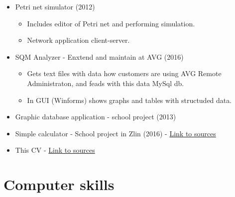 \documentclass[11pt,a4paper,sans]{moderncv}
\newcommand{\Csh}{C{\lserif{\#}}}
\begin{document}
{
\begin{itemize}
	\item Petri net simulator (2012)	
	\begin{itemize}
		\item Includes editor of Petri net and performing simulation.
		\item Network application client-server.
	\end{itemize}
\end{itemize}
}

\cvitemwithcomment{\Csh{}}{}
{
\begin{itemize}
	\item SQM Analyzer - Enxtend and maintain at AVG (2016)
	\begin{itemize}
		\item Gets text files with data how customers are using AVG Remote Administraton, and feads with this data MySql db. 	
		\item In GUI (Winforms) shows graphs and tables with structuded data.
	\end{itemize}
	\item Graphic database application - school project (2013)	
\end{itemize}
}

{
\begin{itemize}
	\item Simple calculator - School project in Zlin (2016) - \href{https://github.com/navrkald/Zlin_wxWidgets_python_simple_calculator}{Link to sources} 
\end{itemize}
}

\cvitemwithcomment{\LaTeX}{}
{
\begin{itemize}
	\item This CV - \href{https://github.com/navrkald/CV_david_navrkal}{Link to sources} 
\end{itemize}
}

\section{Computer skills}

\end{document}
